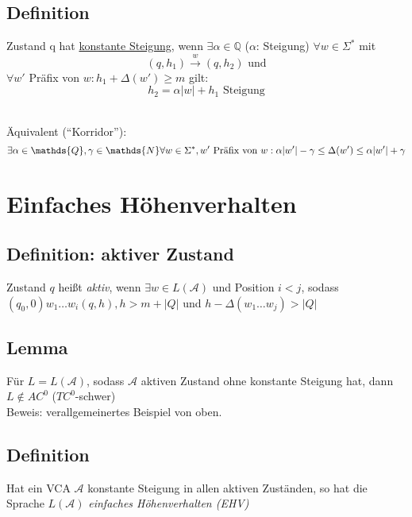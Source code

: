     \subsection{Definition}
        Zustand q hat \underline{konstante Steigung}, wenn $\exists \alpha \in \mathbb{Q}$ ($\alpha$: Steigung) $\forall w \in \Sigma^*$ mit $$ (q,h_1) \xrightarrow{w} (q,h_2)\text{ und}$$
        $\forall w'$ Präfix von $w: h_1 + \Delta(w') \geq m$ gilt:
        $$h_2 = \alpha|w|+h_1 \text{ Steigung}$$
        \\
        Äquivalent (``Korridor''): $$\exists\alpha\in\mathds{Q},\gamma\in\mathds{N}\forall w\in\Sigmas,w'\text{ Präfix von }w:\alpha|w'|-\gamma\le\Delta(w')\le\alpha|w'|+\gamma$$
\section{Einfaches Höhenverhalten}
    \subsection{Definition: aktiver Zustand}
        Zustand $q$ heißt \emph{aktiv}, wenn $\exists w\in L(\mathcal{A})$ und Position $i<j$, sodass $(q_0,0)w_1\dots w_i(q,h),h>m+|Q|$ und $h-\Delta(w_1\dots w_j)>|Q|$
    \subsection{Lemma}
        Für $L=L(\mathcal{A})$, sodass $\mathcal{A}$ aktiven Zustand ohne konstante Steigung hat, dann $L\not\in AC^0$ ($TC^0$-schwer)\\
        Beweis: verallgemeinertes Beispiel von oben.
    \subsection{Definition}
        Hat ein VCA $\mathcal{A}$ konstante Steigung in allen aktiven Zuständen, so hat die Sprache $L(\mathcal{A})$ \emph{einfaches Höhenverhalten (EHV)}
